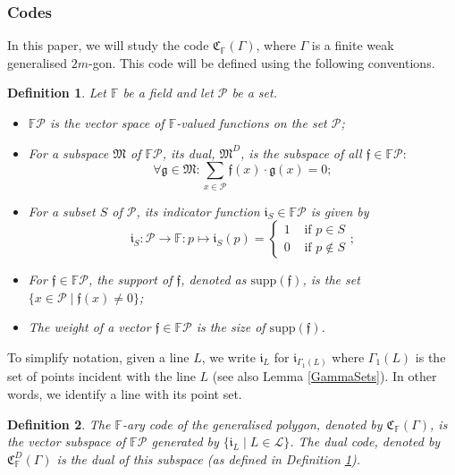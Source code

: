 \documentclass[12pt]{article}
\newcommand{\F}{\mathbb{F}}
\newcommand{\Points}{\mathcal{P}}
\newcommand{\Lines}{\mathcal{L}}
\newcommand{\FP}{\F\Points}
\newcommand{\Code}{\mathfrak{C}_\F}
\renewcommand{\i}{\mathfrak{i}}
\newtheorem{definition}{Definition}
\theoremstyle{remark}
\begin{document}
\subsubsection{Codes}\label{subsection:codes}
In this paper, we will study the code  \(\Code(\Gamma)\), where \(\Gamma\) is a finite weak generalised \(2m\)-gon. This code will be defined using the following conventions.
\begin{definition}\label{def}
	Let \(\mathbb{F}\) be a field and let $\mathcal{P}$ be a set. 
    \begin{itemize}
    \item \(\mathbb{F}\Points\) is the vector space of \(\mathbb{F}\)-valued functions on the set \(\Points\); 
    \item For a subspace 
	 \(\mathfrak{M}\) of \(\mathbb{F}\Points\), its {\em dual}, \(\mathfrak{M}^D\), is the subspace of all \(\mathfrak{f}\in \FP:\) 
	\[\forall \mathfrak{g}\in\mathfrak{M}: \sum_{x\in\Points}\mathfrak{f}(x)\cdot\mathfrak{g}(x) = 0;\]
    \item	For a subset \(S\) of \(\Points\),  its {\em indicator function} \(\mathfrak{i}_{S} \in \mathbb{F}\Points\) is given by  \[\mathfrak{i}_{S}:\Points\to \mathbb{F}:p\mapsto \mathfrak{i}_{S}(p) = \begin{cases}
		1 &\text{ if } p\in S \\
		0 &\text{ if } p\not\in S
	\end{cases};\]
    \item For \(\mathfrak{f}\in\FP\),  the {\em support} of \(\mathfrak{f}\), denoted as \(\text{supp}(\mathfrak{f})\), is the set \(\{x\in\Points\mid \mathfrak{f}(x)\neq 0\}\); 
    \item The weight of a vector $\mathfrak{f}\in \FP$ is the size of $\text{supp}(\mathfrak{f})$.
    \end{itemize}
\end{definition}

To simplify notation, given a line \(L\), we write \(\mathfrak{i}_L\) for \( \mathfrak{i}_{\Gamma_{1}(L)}\) where \(\Gamma_1(L)\) is the set of points incident with the line \(L\) (see also Lemma \ref{GammaSets}). In other words, we identify a line with its point set. 

\begin{definition}
	The \(\mathbb{F}\)-ary code of the generalised polygon, denoted by \(\mathfrak{C}_{\mathbb{F}}(\Gamma)\), is the vector subspace of \(\FP\) generated by \(\{\i_L\mid L\in\Lines \}\). The {\em dual} code, denoted by \(\Code^D(\Gamma)\) is the dual of this subspace (as defined in Definition \ref{def}).
\end{definition}
\end{document}
